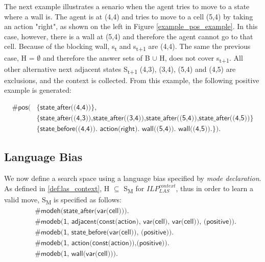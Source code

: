\begin{examp}
The next example illustrates a senario when the agent tries to move to a state where a wall is. 
The agent is at (4,4) and tries to move to a cell (5,4) by taking an action "right", as shown on the left in Figure \ref{example_pos_example}. 
In this case, however, there is a wall at (5,4) and therefore the agent cannot go to that cell.
Because of the blocking wall, s\textsubscript{t} and s\textsubscript{t+1} are (4,4).
The same the previous case, H = $\emptyset$ and therefore the answer sets of B $\cup$ H, does not cover s\textsubscript{t+1}.
All other alternative next adjacent states S\textsubscript{t+1} (4,3), (3,4), (5,4) and (4,5) are exclusions, and the context is collected.
From this example, the following positive example is generated:

\begin{equation}
\begin{split}
\textsf{\#pos(} & \textsf{\{state\_after((4,4))\}}, \\
                & \textsf{\{state\_after((4,3)),state\_after((3,4)),state\_after((5,4)),state\_after((4,5))\}} \\
                & \textsf{\{state\_before((4,4)). action(right). wall((5,4)). wall((4,5)).\}).}
\end{split}
\end{equation}

\end{examp}
\label{state_transition_example}

\subsection{Language Bias}
\label{subsec:language_bias}
We now define a search space using a language bias specified by \textit{mode declaration}.
As defined in \ref{def:las_context}, H $\subseteq$ S\textsubscript{M} for $ILP_{LAS}^{context}$, thus in order to learn a valid move, S\textsubscript{M} is specified as follows:
\begin{equation} \label{eq:sm}
\begin{split}
&\textsf{\#modeh(state\_after(var(cell))).}\\
&\textsf{\#modeb(1, adjacent(const(action), var(cell), var(cell)), (positive)).} \\
&\textsf{\#modeb(1, state\_before(var(cell)), (positive)).} \\
&\textsf{\#modeb(1, action(const(action)),(positive)).} \\
&\textsf{\#modeb(1, wall(var(cell))).} \\
\end{split}
\end{equation}

